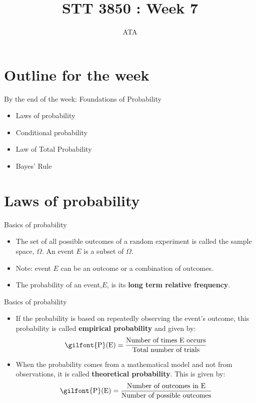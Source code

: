 \documentclass[
  ignorenonframetext,
]{beamer}
\title{STT 3850 : Week 7}
\author{ATA}
\date{}
\institute{Appalachian State University}
\providecommand{\tightlist}{%
  \setlength{\itemsep}{0pt}\setlength{\parskip}{0pt}}
\begin{document}
\frame{\titlepage}

\section{Outline for the week}\label{outline-for-the-week}

\begin{frame}{By the end of the week: Foundations of Probability}
\label{by-the-end-of-the-week-foundations-of-probability}
\begin{itemize}
\tightlist
\item
  Laws of probability
\item
  Conditional probability
\item
  Law of Total Probability
\item
  Bayes' Rule
\end{itemize}
\end{frame}

\section{Laws of probability}\label{laws-of-probability}

\begin{frame}{Basics of probability}
\label{basics-of-probability}
\begin{itemize}
\item
  The set of all possible outcomes of a random experiment is called the
  sample space, \(\Omega\). An event \(E\) is a subset of \(\Omega\).
\item
  Note: event \(E\) can be an outcome or a combination of outcomes.
\item
  The probability of an event,\(E\), is its \textbf{long term relative
  frequency}.
\end{itemize}
\end{frame}

\begin{frame}{Basics of probability}
\label{basics-of-probability-1}
\begin{itemize}
\tightlist
\item
  If the probability is based on repeatedly observing the event's
  outcome, this probability is called \textbf{empirical probability} and
  given by:
  \[\textrm{\gilfont{P}}\normalfont (\text{E})=\frac{\text{Number of times E occurs}}{\text{Total number of trials}}\]
\item
  When the probability comes from a mathematical model and not from
  observations, it is called \textbf{theoretical probability}. This is
  given by:
  \[\textrm{\gilfont{P}}\normalfont (\text{E})=\frac{\text{Number of outcomes in E}}{\text{Number of possible outcomes}}\]
\end{itemize}
\end{frame}
\end{document}
